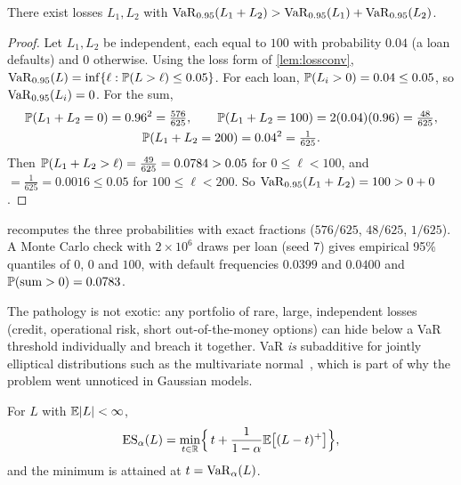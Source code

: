 \begin{theorem}\label{thm:varnotsub}
There exist losses $L_1,L_2$ with $\mathrm{VaR}_{0.95}(L_1+L_2)>\mathrm{VaR}_{0.95}(L_1)+\mathrm{VaR}_{0.95}(L_2)$.
\end{theorem}
\begin{proof}
Let $L_1,L_2$ be independent, each equal to $100$ with probability $0.04$ (a loan defaults) and $0$ otherwise. Using the
loss form of \cref{lem:lossconv}, $\mathrm{VaR}_{0.95}(L)=\inf\{\ell:\mathbb{P}(L>\ell)\le0.05\}$. For each loan,
$\mathbb{P}(L_i>0)=0.04\le0.05$, so $\mathrm{VaR}_{0.95}(L_i)=0$. For the sum,
\begin{gather*} \mathbb{P}(L_1+L_2=0)=0.96^2=\tfrac{576}{625},\qquad \mathbb{P}(L_1+L_2=100)=2(0.04)(0.96)=\tfrac{48}{625},\\ \mathbb{P}(L_1+L_2=200)=0.04^2=\tfrac{1}{625}. \end{gather*}
Then $\mathbb{P}(L_1+L_2>\ell)=\frac{49}{625}=0.0784>0.05$ for $0\le\ell<100$, and $=\frac1{625}=0.0016\le0.05$ for
$100\le\ell<200$. So $\mathrm{VaR}_{0.95}(L_1+L_2)=100>0+0$.
\end{proof}

\begin{verified}
 recomputes the three probabilities with exact fractions ($576/625$, $48/625$, $1/625$). A Monte
Carlo check with $2\times10^6$ draws per loan (seed 7) gives empirical 95\% quantiles of $0$, $0$ and $100$, with default
frequencies $0.0399$ and $0.0400$ and $\mathbb{P}(\text{sum}>0)=0.0783$.
\end{verified}

The pathology is not exotic: any portfolio of rare, large, independent losses (credit, operational risk, short
out-of-the-money options) can hide below a VaR threshold individually and breach it together. VaR \emph{is} subadditive
for jointly elliptical distributions such as the multivariate normal~\cite{mcneil2015qrm}, which is part of why the problem
went unnoticed in Gaussian models.


\begin{theorem}\label{thm:ru}
For $L$ with $\mathbb{E}|L|<\infty$,
\[ \mathrm{ES}_\alpha(L)=\min_{t\in\mathbb{R}}\Bigl\{\,t+\frac{1}{1-\alpha}\mathbb{E}\bigl[(L-t)^+\bigr]\Bigr\}, \]
and the minimum is attained at $t=\mathrm{VaR}_\alpha(L)$.
\end{theorem}

